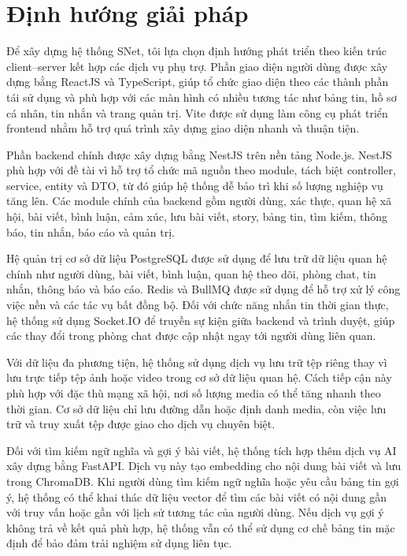 \documentclass[../DoAn.tex]{subfiles}
\begin{document}
\section{Định hướng giải pháp}
\label{section:1.3}
Để xây dựng hệ thống SNet, tôi lựa chọn định hướng phát triển theo kiến trúc client--server kết hợp các dịch vụ phụ trợ. Phần giao diện người dùng được xây dựng bằng ReactJS và TypeScript, giúp tổ chức giao diện theo các thành phần tái sử dụng và phù hợp với các màn hình có nhiều tương tác như bảng tin, hồ sơ cá nhân, tin nhắn và trang quản trị. Vite được sử dụng làm công cụ phát triển frontend nhằm hỗ trợ quá trình xây dựng giao diện nhanh và thuận tiện.

Phần backend chính được xây dựng bằng NestJS trên nền tảng Node.js. NestJS phù hợp với đề tài vì hỗ trợ tổ chức mã nguồn theo module, tách biệt controller, service, entity và DTO, từ đó giúp hệ thống dễ bảo trì khi số lượng nghiệp vụ tăng lên. Các module chính của backend gồm người dùng, xác thực, quan hệ xã hội, bài viết, bình luận, cảm xúc, lưu bài viết, story, bảng tin, tìm kiếm, thông báo, tin nhắn, báo cáo và quản trị.

Hệ quản trị cơ sở dữ liệu PostgreSQL được sử dụng để lưu trữ dữ liệu quan hệ chính như người dùng, bài viết, bình luận, quan hệ theo dõi, phòng chat, tin nhắn, thông báo và báo cáo. Redis và BullMQ được sử dụng để hỗ trợ xử lý công việc nền và các tác vụ bất đồng bộ. Đối với chức năng nhắn tin thời gian thực, hệ thống sử dụng Socket.IO để truyền sự kiện giữa backend và trình duyệt, giúp các thay đổi trong phòng chat được cập nhật ngay tới người dùng liên quan.

Với dữ liệu đa phương tiện, hệ thống sử dụng dịch vụ lưu trữ tệp riêng thay vì lưu trực tiếp tệp ảnh hoặc video trong cơ sở dữ liệu quan hệ. Cách tiếp cận này phù hợp với đặc thù mạng xã hội, nơi số lượng media có thể tăng nhanh theo thời gian. Cơ sở dữ liệu chỉ lưu đường dẫn hoặc định danh media, còn việc lưu trữ và truy xuất tệp được giao cho dịch vụ chuyên biệt.

Đối với tìm kiếm ngữ nghĩa và gợi ý bài viết, hệ thống tích hợp thêm dịch vụ AI xây dựng bằng FastAPI. Dịch vụ này tạo embedding cho nội dung bài viết và lưu trong ChromaDB. Khi người dùng tìm kiếm ngữ nghĩa hoặc yêu cầu bảng tin gợi ý, hệ thống có thể khai thác dữ liệu vector để tìm các bài viết có nội dung gần với truy vấn hoặc gần với lịch sử tương tác của người dùng. Nếu dịch vụ gợi ý không trả về kết quả phù hợp, hệ thống vẫn có thể sử dụng cơ chế bảng tin mặc định để bảo đảm trải nghiệm sử dụng liên tục.
\end{document}
